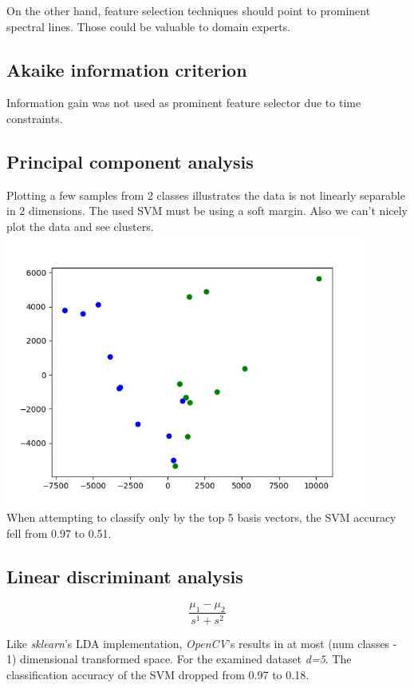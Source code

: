 \documentclass{article}
\begin{document}
On the other hand, feature selection techniques should point to prominent spectral lines.
Those could be valuable to domain experts.


\subsection{Akaike information criterion}
Information gain was not used as prominent feature selector due to time constraints.


\subsection{Principal component analysis}
Plotting a few samples from 2 classes illustrates the data is not linearly separable in 2 dimensions.
The used SVM must be using a soft margin.
Also we can't nicely plot the data and see clusters.
\\
\includegraphics[width=0.9\textwidth]{img/pca}
\\
When attempting to classify only by the top 5 basis vectors, the SVM accuracy fell from 0.97 to 0.51.


\subsection{Linear discriminant analysis}
$$ \frac{ \mu_1 - \mu_2 } { s^1 + s^2 } $$  %

Like \textit{sklearn}'s LDA implementation, \textit{OpenCV}'s results in at most (num classes - 1) dimensional transformed space.
For the examined dataset \textit{d=5}.
The classification accuracy of the SVM dropped from 0.97 to 0.18.
\end{document}
